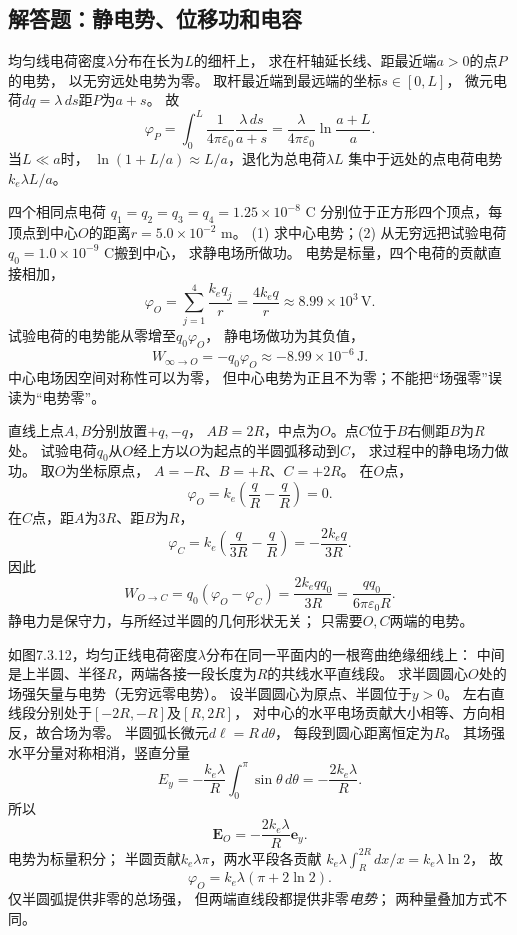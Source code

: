 \subsection{解答题：静电势、位移功和电容}

\problemtext 均匀线电荷密度$\lambda$分布在长为$L$的细杆上，
求在杆轴延长线、距最近端$a>0$的点$P$的电势，
以无穷远处电势为零。
\workings
取杆最近端到最远端的坐标$s\in[0,L]$，
微元电荷$dq=\lambda\,ds$距$P$为$a+s$。
故
\[
\varphi_P=\int_0^L\frac1{4\pi\varepsilon_0}
\frac{\lambda\,ds}{a+s}
=\boxed{\frac{\lambda}{4\pi\varepsilon_0}
\ln\frac{a+L}{a}}.
\]
\crosscheck 当$L\ll a$时，
$\ln(1+L/a)\approx L/a$，退化为总电荷$\lambda L$
集中于远处的点电荷电势$k_e\lambda L/a$。

\problemtext 四个相同点电荷
$q_1=q_2=q_3=q_4=1.25\times10^{-8}$ C
分别位于正方形四个顶点，每顶点到中心$O$的距离$r=5.0\times10^{-2}$ m。
(1) 求中心电势；(2) 从无穷远把试验电荷$q_0=1.0\times10^{-9}$ C搬到中心，
求静电场所做功。
\workings
电势是标量，四个电荷的贡献直接相加，
\[
\boxed{\varphi_O=\sum_{j=1}^4\frac{k_eq_j}{r}
=\frac{4k_eq}{r}
\approx8.99\times10^3\,\mathrm V}.
\]
试验电荷的电势能从零增至$q_0\varphi_O$，
静电场做功为其负值，
\[
\boxed{W_{\infty\to O}=-q_0\varphi_O
\approx-8.99\times10^{-6}\,\mathrm J}.
\]
\crosscheck 中心电场因空间对称性可以为零，
但中心电势为正且不为零；不能把“场强零”误读为“电势零”。

\problemtext 直线上点$A,B$分别放置$+q,-q$，
$AB=2R$，中点为$O$。点$C$位于$B$右侧距$B$为$R$处。
试验电荷$q_0$从$O$经上方以$O$为起点的半圆弧移动到$C$，
求过程中的静电场力做功。
\workings
取$O$为坐标原点，
$A=-R$、$B=+R$、$C=+2R$。
在$O$点，
\[
\varphi_O=k_e\left(\frac qR-\frac qR\right)=0.
\]
在$C$点，距$A$为$3R$、距$B$为$R$，
\[
\varphi_C=k_e\left(\frac{q}{3R}-\frac qR\right)
=-\frac{2k_eq}{3R}.
\]
因此
\[
\boxed{W_{O\to C}=q_0(\varphi_O-\varphi_C)
=\frac{2k_eqq_0}{3R}
=\frac{qq_0}{6\pi\varepsilon_0R}}.
\]
\crosscheck 静电力是保守力，与所经过半圆的几何形状无关；
只需要$O,C$两端的电势。

\problemtext 如图7.3.12，均匀正线电荷密度$\lambda$分布在同一平面内的一根弯曲绝缘细线上：
中间是上半圆、半径$R$，两端各接一段长度为$R$的共线水平直线段。
求半圆圆心$O$处的场强矢量与电势（无穷远零电势）。
\workings
设半圆圆心为原点、半圆位于$y>0$。
左右直线段分别处于$[-2R,-R]$及$[R,2R]$，
对中心的水平电场贡献大小相等、方向相反，故合场为零。
半圆弧长微元$d\ell=R\,d\theta$，
每段到圆心距离恒定为$R$。
其场强水平分量对称相消，竖直分量
\[
E_y=-\frac{k_e\lambda}{R}
\int_0^\pi\sin\theta\,d\theta
=-\frac{2k_e\lambda}{R}.
\]
所以
\[
\boxed{\bm E_O=-\frac{2k_e\lambda}{R}\bm e_y}.
\]
电势为标量积分；
半圆贡献$k_e\lambda\pi$，两水平段各贡献
$k_e\lambda\int_R^{2R}dx/x=k_e\lambda\ln2$，
故
\[
\boxed{\varphi_O=k_e\lambda(\pi+2\ln2)}.
\]
\crosscheck 仅半圆弧提供非零的总场强，
但两端直线段都提供非零\emph{电势}；
两种量叠加方式不同。

